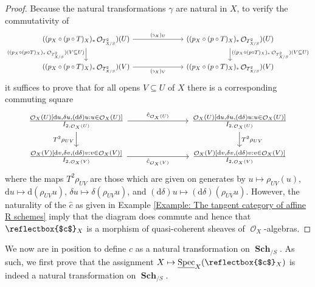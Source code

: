 \documentclass{amsart}
\theoremstyle{definition}
\DeclareMathOperator{\Ocal}{\mathcal{O}}
\DeclareMathOperator{\Spec}{Spec}
\newcommand{\RelSpec}[1]{\underline{\Spec}_{#1}}
\DeclareMathOperator{\Sch}{\mathbf{Sch}}
\numberwithin{equation}{subsection}
\begin{document}
\begin{proof}
Because the natural transformations $\gamma$ are natural in $X$, to verify the commutativity of
\[
\begin{tikzcd}
((p_X \circ (p \circ T)_X)_{\ast}\Ocal_{T^2_{X/S}})(U) \ar[d, swap]{}{((p_X \circ (p \circ T)_X)_{\ast}\Ocal_{T^2_{X/S}})(V \subseteq U)} \ar[rrr]{}{(\reflectbox{$c$}_X)_U} & & & ((p_X \circ (p \circ T)_X)_{\ast}\Ocal_{T^2_{X/S}})(U) \ar[d]{}{((p_X \circ (p \circ T)_X)_{\ast}\Ocal_{T^2_{X/S}})(V \subseteq U)} \\
((p_X \circ (p \circ T)_X)_{\ast}\Ocal_{T^2_{X/S}})(V) \ar[rrr, swap]{}{(\reflectbox{$c$}_X)_V} & & & ((p_X \circ (p \circ T)_X)_{\ast}\Ocal_{T^2_{X/S}})(V)
\end{tikzcd}
\] 
it suffices to prove that for all opens $V \subseteq U$ of $X$ there is a corresponding commuting square
\[
\begin{tikzcd}
\frac{\Ocal_X(U)[\mathrm{d}u, \delta u, (\mathrm{d}\delta)u:u \in \Ocal_X(U)]}{I_{2,\Ocal_X(U)}} \ar[d,swap]{}{T^2\rho_{UV}} \ar[rrr]{}{\hat{c}_{\Ocal_X(U)}} & & & \frac{\Ocal_X(U)[\mathrm{d}u, \delta u, (\mathrm{d}\delta)u:u \in \Ocal_X(U)]}{I_{2,\Ocal_X(U)}} \ar[d]{}{T^2\rho_{UV}} \\
\frac{\Ocal_X(V)[\mathrm{d}v, \delta v, (\mathrm{d}\delta)v:v \in \Ocal_X(V)]}{I_{2,\Ocal_X(V)}} \ar[rrr, swap]{}{\hat{c}_{\Ocal_X(V)}} & & & \frac{\Ocal_X(V)[\mathrm{d}v, \delta v, (\mathrm{d}\delta)v:v \in \Ocal_X(V)]}{I_{2,\Ocal_X(V)}}
\end{tikzcd}
\]
where the maps $T^2\rho_{UV}$ are those which are given on generates by $u \mapsto \rho_{UV}(u)$, $\mathrm{d}u \mapsto \mathrm{d}(\rho_{UV}u)$, $\delta u \mapsto \delta(\rho_{UV}u)$, and $(\mathrm{d}\delta)u \mapsto (\mathrm{d}\delta)(\rho_{UV}u)$. However, the naturality of the $\hat{c}$ as given in Example \ref{Example: The tangent category of affine R schemes} imply that the diagram does commute and hence that $\reflectbox{$c$}_X$ is a morphism of quasi-coherent sheaves of $\Ocal_X$-algebras. 
\end{proof}

We now are in position to define $c$ as a natural transformation on $\Sch_{/S}$. As such, we first prove that the assignment $X \mapsto \RelSpec{X}(\reflectbox{$c$}_X)$ is indeed a natural transformation on $\Sch_{/S}$.
\end{document}
